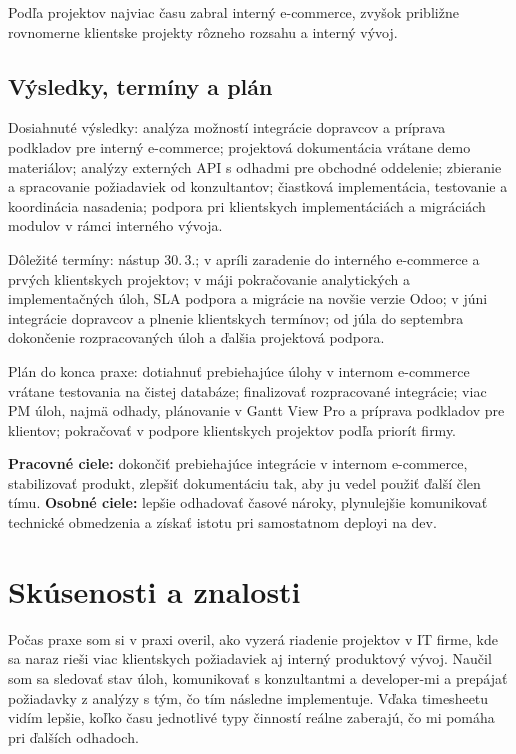 \documentclass[12pt,a4paper]{article}
\begin{document}
\noindent Podľa projektov najviac času zabral interný e-commerce, zvyšok približne rovnomerne klientske projekty rôzneho rozsahu a interný vývoj.

\subsection{Výsledky, termíny a plán}

Dosiahnuté výsledky: analýza možností integrácie dopravcov a príprava podkladov pre interný e-commerce; projektová dokumentácia vrátane demo materiálov; analýzy externých API s odhadmi pre obchodné oddelenie; zbieranie a spracovanie požiadaviek od konzultantov; čiastková implementácia, testovanie a koordinácia nasadenia; podpora pri klientskych implementáciách a migráciách modulov v rámci interného vývoja.

Dôležité termíny: nástup 30.\,3.; v apríli zaradenie do interného e-commerce a prvých klientskych projektov; v máji pokračovanie analytických a implementačných úloh, SLA podpora a migrácie na novšie verzie Odoo; v júni integrácie dopravcov a plnenie klientskych termínov; od júla do septembra dokončenie rozpracovaných úloh a ďalšia projektová podpora.

Plán do konca praxe: dotiahnuť prebiehajúce úlohy v internom e-commerce vrátane testovania na čistej databáze; finalizovať rozpracované integrácie; viac PM úloh, najmä odhady, plánovanie v Gantt View Pro a príprava podkladov pre klientov; pokračovať v podpore klientskych projektov podľa priorít firmy.

\textbf{Pracovné ciele:} dokončiť prebiehajúce integrácie v internom e-commerce, stabilizovať produkt, zlepšiť dokumentáciu tak, aby ju vedel použiť ďalší člen tímu. \textbf{Osobné ciele:} lepšie odhadovať časové nároky, plynulejšie komunikovať technické obmedzenia a získať istotu pri samostatnom deployi na dev.

\section{Skúsenosti a znalosti}

Počas praxe som si v praxi overil, ako vyzerá riadenie projektov v IT firme, kde sa naraz rieši viac klientskych požiadaviek aj interný produktový vývoj. Naučil som sa sledovať stav úloh, komunikovať s konzultantmi a developer-mi a prepájať požiadavky z analýzy s tým, čo tím následne implementuje. Vďaka timesheetu vidím lepšie, koľko času jednotlivé typy činností reálne zaberajú, čo mi pomáha pri ďalších odhadoch.
\end{document}
